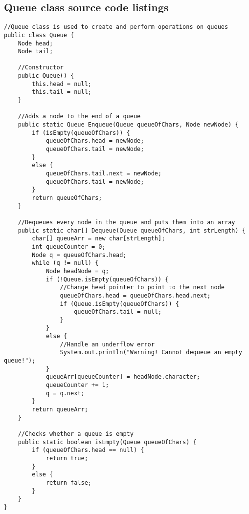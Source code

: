 \documentclass[letterpaper, 10pt,DIV=13]{scrartcl}
\numberwithin{equation}{section} %
\numberwithin{figure}{section} %
\numberwithin{table}{section} %
\begin{document}
\subsection{Queue class source code listings}
\lstset{numbers=left, numberstyle=\tiny, stepnumber=1, numbersep=5pt, basicstyle=\footnotesize\ttfamily}
\begin{lstlisting}[frame=single, ] 
//Queue class is used to create and perform operations on queues
public class Queue {
    Node head; 
    Node tail;

    //Constructor
    public Queue() {
        this.head = null;
        this.tail = null;
    }

    //Adds a node to the end of a queue
    public static Queue Enqueue(Queue queueOfChars, Node newNode) {
        if (isEmpty(queueOfChars)) {
            queueOfChars.head = newNode;
            queueOfChars.tail = newNode;
        }
        else {
            queueOfChars.tail.next = newNode;
            queueOfChars.tail = newNode;
        }
        return queueOfChars;
    }
    
    //Dequeues every node in the queue and puts them into an array
    public static char[] Dequeue(Queue queueOfChars, int strLength) {
        char[] queueArr = new char[strLength];
        int queueCounter = 0;
        Node q = queueOfChars.head;
        while (q != null) {
            Node headNode = q;
            if (!Queue.isEmpty(queueOfChars)) {
                //Change head pointer to point to the next node
                queueOfChars.head = queueOfChars.head.next;
                if (Queue.isEmpty(queueOfChars)) {
                    queueOfChars.tail = null;
                }
            } 
            else {
                //Handle an underflow error
                System.out.println("Warning! Cannot dequeue an empty queue!");
            }
            queueArr[queueCounter] = headNode.character;
            queueCounter += 1;
            q = q.next;
        }
        return queueArr;
    }

    //Checks whether a queue is empty
    public static boolean isEmpty(Queue queueOfChars) {
        if (queueOfChars.head == null) {
            return true;
        }
        else {
            return false;
        }
    }
}
\end{lstlisting}
\end{document}
